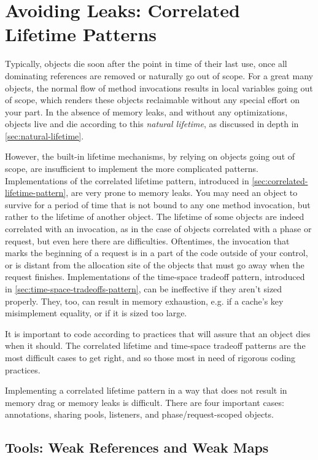 \chapter{Avoiding Leaks: Correlated Lifetime Patterns}
\label{chapter:lifetime-implementation-strategies}

Typically, objects die soon after the point in time of their last use, once all
dominating references are removed or naturally go out of scope. For a great many
objects, the normal flow of method invocations results in local variables going
out of scope, which renders these objects reclaimable without any special effort
on your part. In the absence of memory leaks, and without any optimizations,
objects live and die according to this \emph{natural lifetime}, as discussed in
depth in \autoref{sec:natural-lifetime}. 

However, the built-in lifetime mechanisms, by relying on objects going out of
scope, are insufficient to implement the more complicated patterns.
Implementations of the correlated lifetime pattern, introduced in
\autoref{sec:correlated-lifetime-pattern}, are very prone to memory leaks. You
may need an object to survive for a period of time that is not bound to any one
method invocation, but rather to the lifetime of another object. The lifetime of
some objects are indeed correlated with an invocation, as in the case of objects
correlated with a phase or request, but even here there are difficulties.
Oftentimes, the invocation that marks the beginning of a request is in a part of
the code outside of your control, or is distant from the allocation site of the
objects that must go away when the request finishes. Implementations of the
time-space tradeoff pattern, introduced in
\autoref{sec:time-space-tradeoffs-pattern}, can be ineffective if they aren't
sized properly. They, too, can result in memory exhaustion, e.g. if a cache's key
misimplement equality, or if it is sized too large.

It is important to code according to practices that will assure that an object
dies when it should. The correlated lifetime and time-space tradeoff patterns are
the most difficult cases to get right, and so those most in need of rigorous
coding practices.

Implementing a correlated lifetime pattern in a way that does not result in
memory drag or memory leaks is difficult. There are four important cases:
annotations, sharing pools, listeners, and phase/request-scoped objects.

\section{Tools: Weak References and Weak Maps}
